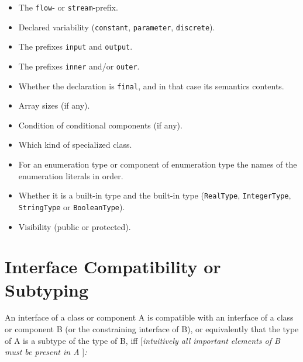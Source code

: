 \begin{itemize}
  \begin{itemize}
  \item
    The \lstinline[basicstyle=\ttfamily]!flow!- or \lstinline[basicstyle=\ttfamily]!stream!-prefix.
  \item
    Declared variability (\lstinline[basicstyle=\ttfamily]!constant!, \lstinline[basicstyle=\ttfamily]!parameter!, \lstinline[basicstyle=\ttfamily]!discrete!).
  \item
    The prefixes \lstinline[basicstyle=\ttfamily]!input! and \lstinline[basicstyle=\ttfamily]!output!.
  \item
    The prefixes \lstinline[basicstyle=\ttfamily]!inner! and/or \lstinline[basicstyle=\ttfamily]!outer!.
  \item
    Whether the declaration is \lstinline[basicstyle=\ttfamily]!final!, and in that case its semantics
    contents.
  \item
    Array sizes (if any).
  \item
    Condition of conditional components (if any).
  \item
    Which kind of specialized class.
  \item
    For an enumeration type or component of enumeration type the names
    of the enumeration literals in order.
  \item
    Whether it is a built-in type and the built-in type (\lstinline[basicstyle=\ttfamily]!RealType!,
    \lstinline[basicstyle=\ttfamily]!IntegerType!, \lstinline[basicstyle=\ttfamily]!StringType! or \lstinline[basicstyle=\ttfamily]!BooleanType!).
  \item
    Visibility (public or protected).
  \end{itemize}
\end{itemize}

\section{Interface Compatibility or Subtyping}

An interface of a class or component A is compatible with an interface
of a class or component B (or the constraining interface of B), or
equivalently that the type of A is a subtype of the type of B, iff
{[}\emph{intuitively all important elements of B must be present in A}
{]}\emph{:}

